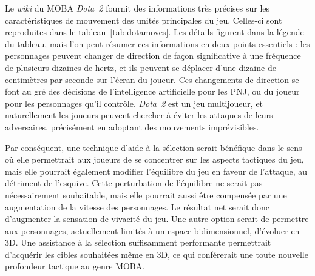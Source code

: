 	Le \emph{wiki} du MOBA \emph{Dota~2} fournit des informations très précises sur les caractéristiques de mouvement des unités principales du jeu\footnotemark{}. Celles-ci sont reproduites dans le tableau~\ref{tab:dotamoves}. Les détails figurent dans la légende du tableau, mais l'on peut résumer ces informations en deux points essentiels : les personnages peuvent changer de direction de façon significative à une fréquence de plusieurs dizaines de hertz, et ils peuvent se déplacer d'une dizaine de centimètres par seconde sur l'écran du joueur. Ces changements de direction se font au gré des décisions de l'intelligence artificielle pour les PNJ, ou du joueur pour les personnages qu'il contrôle. \emph{Dota~2} est un jeu multijoueur, et naturellement les joueurs peuvent chercher à éviter les attaques de leurs adversaires, précisément en adoptant des mouvements imprévisibles.
	
	Par conséquent, une technique d'aide à la sélection serait bénéfique dans le sens où elle permettrait aux joueurs de se concentrer sur les aspects tactiques du jeu, mais elle pourrait également modifier l'équilibre du jeu en faveur de l'attaque, au détriment de l'esquive. Cette perturbation de l'équilibre ne serait pas nécessairement souhaitable, mais elle pourrait aussi être compensée par une augmentation de la vitesse des personnages. Le résultat net serait donc d'augmenter la sensation de vivacité du jeu. Une autre option serait de permettre aux personnages, actuellement limités à un espace bidimensionnel, d'évoluer en 3D. Une assistance à la sélection suffisamment performante permettrait d'acquérir les cibles souhaitées même en 3D, ce qui conférerait une toute nouvelle profondeur tactique au genre MOBA.
	
	
